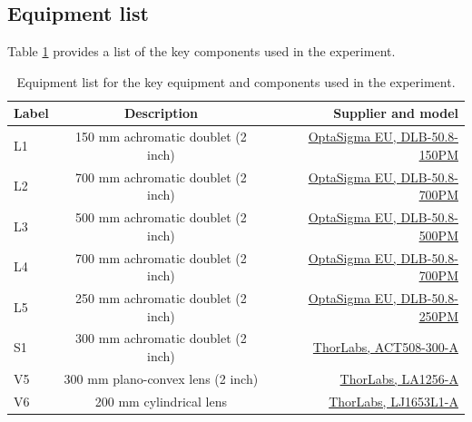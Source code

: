 \begin{landscape}
	
	\section{Equipment list}
	\label{sec:Equipment}
	
	Table \ref{tab:Apparatus list} provides a list of the key components used in the experiment.
	
\begin{table} [ht]%
\centering
\caption{\label{tab:Apparatus list}%
Equipment list for the key equipment and components used in the experiment.
}
\begin{tabular}{lcr}
\hline\hline
Label & Description & Supplier and model \\
\hline
L1 & 150 mm achromatic doublet (2 inch) & \href{https://www.optosigma.com/eu_en/optics/lenses/achromatic-lenses/achromatic-doublet-50-8mm-diameter-150-7mm-focal-length-DLB-50.8-150PM.html}{OptaSigma EU, DLB-50.8-150PM}\\
L2 & 700 mm achromatic doublet (2 inch) & \href{https://www.optosigma.com/eu_en/optics/lenses/achromatic-lenses/achromatic-doublet-50-8mm-diameter-700mm-focal-length-DLB-50.8-700PM.html}{OptaSigma EU, DLB-50.8-700PM}\\
L3 & 500 mm achromatic doublet (2 inch) & \href{https://www.optosigma.com/eu_en/optics/lenses/achromatic-lenses/achromatic-doublet-50-8mm-diameter-500-3mm-focal-length-DLB-50.8-500PM.html}{OptaSigma EU, DLB-50.8-500PM}\\
L4 & 700 mm achromatic doublet (2 inch) & \href{https://www.optosigma.com/eu_en/optics/lenses/achromatic-lenses/achromatic-doublet-50-8mm-diameter-700mm-focal-length-DLB-50.8-700PM.html}{OptaSigma EU, DLB-50.8-700PM}\\
L5 & 250 mm achromatic doublet (2 inch) & \href{https://www.optosigma.com/eu_en/optics/lenses/achromatic-lenses/achromatic-doublet-50-8mm-diameter-249-4mm-focal-length-DLB-50.8-250PM.html}{OptaSigma EU, DLB-50.8-250PM}\\
S1 & 300 mm achromatic doublet (2 inch) & \href{https://www.thorlabs.com/newgrouppage9.cfm?objectgroup_id=120}{ThorLabs, ACT508-300-A}\\
V5 & 300 mm plano-convex lens (2 inch) & \href{https://www.thorlabs.com/thorproduct.cfm?partnumber=LA1256-A}{ThorLabs, LA1256-A}\\
V6 & 200 mm cylindrical lens & \href{https://www.thorlabs.com/thorproduct.cfm?partnumber=LJ1653L1-A}{ThorLabs, LJ1653L1-A}\\

\end{tabular}
\end{table}
\end{landscape}
